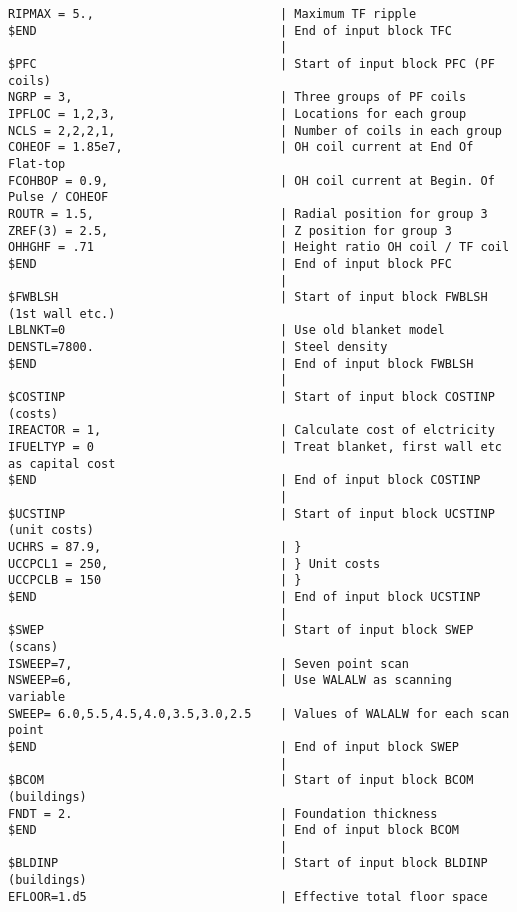\begin{verbatim}
RIPMAX = 5.,                          | Maximum TF ripple
$END                                  | End of input block TFC
                                      | 
$PFC                                  | Start of input block PFC (PF coils)
NGRP = 3,                             | Three groups of PF coils
IPFLOC = 1,2,3,                       | Locations for each group
NCLS = 2,2,2,1,                       | Number of coils in each group
COHEOF = 1.85e7,                      | OH coil current at End Of Flat-top
FCOHBOP = 0.9,                        | OH coil current at Begin. Of Pulse / COHEOF
ROUTR = 1.5,                          | Radial position for group 3
ZREF(3) = 2.5,                        | Z position for group 3
OHHGHF = .71                          | Height ratio OH coil / TF coil
$END                                  | End of input block PFC
                                      | 
$FWBLSH                               | Start of input block FWBLSH (1st wall etc.)
LBLNKT=0                              | Use old blanket model
DENSTL=7800.                          | Steel density
$END                                  | End of input block FWBLSH
                                      | 
$COSTINP                              | Start of input block COSTINP (costs)
IREACTOR = 1,                         | Calculate cost of elctricity
IFUELTYP = 0                          | Treat blanket, first wall etc as capital cost
$END                                  | End of input block COSTINP
                                      | 
$UCSTINP                              | Start of input block UCSTINP (unit costs)
UCHRS = 87.9,                         | }
UCCPCL1 = 250,                        | } Unit costs
UCCPCLB = 150                         | }
$END                                  | End of input block UCSTINP
                                      | 
$SWEP                                 | Start of input block SWEP (scans)
ISWEEP=7,                             | Seven point scan
NSWEEP=6,                             | Use WALALW as scanning variable
SWEEP= 6.0,5.5,4.5,4.0,3.5,3.0,2.5    | Values of WALALW for each scan point
$END                                  | End of input block SWEP
                                      | 
$BCOM                                 | Start of input block BCOM (buildings)
FNDT = 2.                             | Foundation thickness
$END                                  | End of input block BCOM
                                      | 
$BLDINP                               | Start of input block BLDINP (buildings)
EFLOOR=1.d5                           | Effective total floor space

\end{verbatim}
